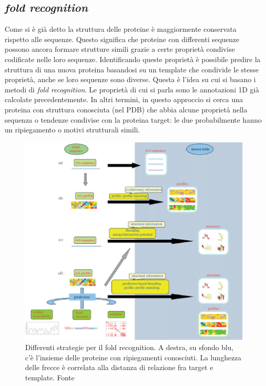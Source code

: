 \subsection{\textit{fold recognition}}
{

Come si è già detto la struttura delle proteine è maggiormente conservata rispetto alle sequenze. Questo significa che proteine con differenti sequenze possono ancora formare strutture simili grazie a certe proprietà condivise codificate nelle loro sequenze. Identificando queste proprietà è possibile predire la struttura di una nuova proteina basandosi su un template che condivide le stesse proprietà, anche se loro sequenze sono diverse. Questa è l'idea su cui si basano i metodi di \textit{fold recognition}. Le proprietà di cui si parla sono le annotazioni 1D già calcolate precedentemente.
In altri termini, in questo approccio si cerca una proteina con struttura conosciuta (nel PDB) che abbia alcune proprietà nella sequenza o tendenze condivise con la proteina target: le due probabilmente hanno un ripiegamento o motivi strutturali simili.

\begin{figure}[!htb]
	\centering
	\includegraphics[scale=0.53]{images/threading-mappa.png}
	\caption{Differenti strategie per il fold recognition. A destra, su sfondo blu, c'è l'insieme delle proteine con ripiegamenti conosciuti. La lunghezza delle frecce è correlata alla distanza di relazione fra target e template. Fonte\cite{joseph2014local}}
	\label{fig:fold-recognition}
\end{figure}

}
